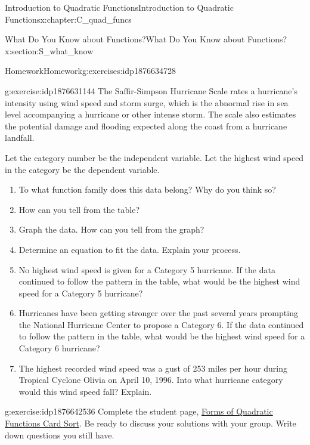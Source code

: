 \documentclass[oneside,10pt,]{book}
\numberwithin{equation}{chapter}
\begin{document}
\begin{chapterptx}{Introduction to Quadratic Functions}{}{Introduction to Quadratic Functions}{}{}{x:chapter:C_quad_funcs}
\begin{sectionptx}{What Do You Know about Functions?}{}{What Do You Know about Functions?}{}{}{x:section:S_what_know}
\begin{exercises-subsection}{Homework}{}{Homework}{}{}{g:exercises:idp1876634728}
\begin{divisionexercise}{2}{}{}{g:exercise:idp1876631144}
The Saffir-Simpson Hurricane Scale rates a hurricane's intensity using wind speed and storm surge, which is the abnormal rise in sea level accompanying a hurricane or other intense storm. The scale also estimates the potential damage and flooding expected along the coast from a hurricane landfall. \footnotemark{}%
\par
Let the category number be the independent variable. Let the highest wind speed in the category be the dependent variable.%
\begin{enumerate}[font=\bfseries,label=(\alph*),ref=\alph*]
\item{}To what function family does this data belong? Why do you think so?%
\item{}How can you tell from the table?%
\item{}Graph the data. How can you tell from the graph?%
\item{}Determine an equation to fit the data. Explain your process.%
\item{}No highest wind speed is given for a Category 5 hurricane. If the data continued to follow the pattern in the table, what would be the highest wind speed for a Category 5 hurricane?%
\item{}Hurricanes have been getting stronger over the past several years prompting the National Hurricane Center to propose a Category 6. If the data continued to follow the pattern in the table, what would be the highest wind speed for a Category 6 hurricane?%
\item{}The highest recorded wind speed was a gust of 253 miles per hour during Tropical Cyclone Olivia on April 10, 1996. Into what hurricane category would this wind speed fall? Explain.%
\end{enumerate}
\end{divisionexercise}%
%
%
\begin{divisionexercise}{3}{}{}{g:exercise:idp1876642536}%
Complete the student page, \hyperref[x:worksheet:act-quad-forms-card-sort]{Forms of Quadratic Functions Card Sort}. Be ready to discuss your solutions with your group. Write down questions you still have.%
\end{divisionexercise}%
\end{exercises-subsection}
%
%
\typeout{************************************************}

\end{sectionptx}
\end{chapterptx}
\end{document}
